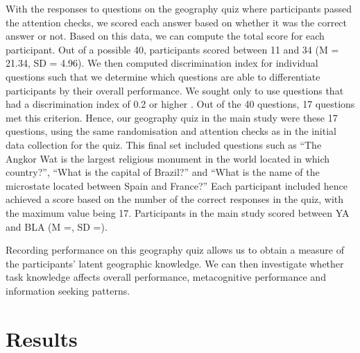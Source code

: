 \documentclass[a4paper, nobind]{templates/ociamthesis}
\begin{document}
With the responses to questions on the geography quiz where participants passed the attention checks, we scored each answer based on whether it was the correct answer or not. Based on this data, we can compute the total score for each participant. Out of a possible 40, participants scored between 11 and 34 (M = 21.34, SD = 4.96). We then computed discrimination index for individual questions such that we determine which questions are able to differentiate participants by their overall performance. We sought only to use questions that had a discrimination index of 0.2 or higher . Out of the 40 questions, 17 questions met this criterion. Hence, our geography quiz in the main study were these 17 questions, using the same randomisation and attention checks as in the initial data collection for the quiz. This final set included questions such as ``The Angkor Wat is the largest religious monument in the world located in which country?'', ``What is the capital of Brazil?'' and ``What is the name of the microstate located between Spain and France?'' Each participant included hence achieved a score based on the number of the correct responses in the quiz, with the maximum value being 17. Participants in the main study scored between YA and BLA (M =, SD =).

Recording performance on this geography quiz allows us to obtain a measure of the participants' latent geographic knowledge. We can then investigate whether task knowledge affects overall performance, metacognitive performance and information seeking patterns.

\hypertarget{results-1}{%
\section*{Results}\label{results-1}}
\end{document}
